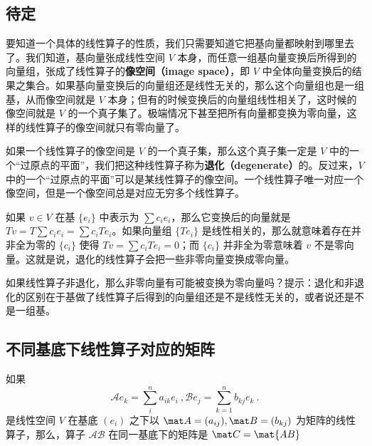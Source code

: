 \subsection{待定}



要知道一个具体的线性算子的性质，我们只需要知道它把基向量都映射到哪里去了。我们知道，基向量张成线性空间 $V$ 本身，而任意一组基向量变换后所得到的向量组，张成了线性算子的\textbf{像空间（image space）}，即 $V$ 中全体向量变换后的结果之集合。如果基向量变换后的向量组还是线性无关的，那么这个向量组也是一组基，从而像空间就是 $V$ 本身；但有的时候变换后的向量组线性相关了，这时候的像空间就是 $V$ 的一个真子集了。极端情况下甚至把所有向量都变换为零向量，这样的线性算子的像空间就只有零向量了。

如果一个线性算子的像空间是 $V$ 的一个真子集，那么这个真子集一定是 $V$ 中的一个“过原点的平面”，我们把这种线性算子称为\textbf{退化（degenerate）}的。反过来，$V$ 中的一个“过原点的平面”可以是某线性算子的像空间。一个线性算子唯一对应一个像空间，但是一个像空间总是对应无穷多个线性算子。

如果 $v\in V$ 在基 $\{{e}_i\}$ 中表示为 $\sum c_i {e}_i$，那么它变换后的向量就是 $T v=T\sum c_i {e}_i=\sum c_iT {e}_i$。如果向量组 $\{T {e}_i\}$ 是线性相关的，那么就意味着存在并非全为零的 $\{c_i\}$ 使得 $T v=\sum c_iT {e}_i=0$；而 $\{c_i\}$ 并非全为零意味着 $v$ 不是零向量。这就是说，退化的线性算子会把一些非零向量变换成零向量。

\begin{exercise}{}
如果线性算子非退化，那么非零向量有可能被变换为零向量吗？提示：退化和非退化的区别在于基做了线性算子后得到的向量组还是不是线性无关的，或者说还是不是一组基。
\end{exercise}

\subsection{不同基底下线性算子对应的矩阵}\label{sub_LiOper_1}


\begin{theorem}{}\label{the_LiOper_1}
如果
\begin{equation}
\mathcal{A} e_k = \sum_i^{n}a_{ik} e_i~, \mathcal{B} e_j = \sum_{k=1}^n b_{kj} e_k~.
\end{equation}
是线性空间 $V$ 在基底 $(e_i)$ 之下以 $\mat A=(a_{ij}), \mat B=(b_{kj})$ 为矩阵的线性算子，那么，算子 $\mathcal{AB}$ 在同一基底下的矩阵是 $\mat C=\mat{AB}$
\end{theorem}

